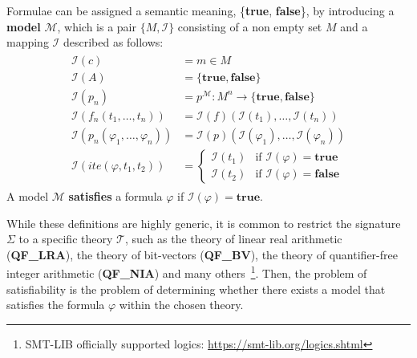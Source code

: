 \documentclass[runningheads]{llncs}
\begin{document}
Formulae can be assigned a semantic meaning, \{\textbf{true}, \textbf{false}\}, by introducing a \textbf{model} $\mathcal{M}$, which is a pair $\{M, \mathcal{I}\}$ consisting of a non empty set $M$ and a mapping $\mathcal{I}$ described as follows:
\begin{gather*}
    \begin{array}{ll}
        \mathcal{I}(c)                                & = m \in M                                                               \\
        \mathcal{I}(A)                                & = \{\textbf{true}, \textbf{false}\}                                     \\
        \mathcal{I}(p_n)                              & = p^{\mathcal{M}} : M^n \rightarrow \{\textbf{true}, \textbf{false}\}   \\
        \mathcal{I}(f_n(t_1, \dots, t_n))             & = \mathcal{I}(f)(\mathcal{I}(t_1), \dots, \mathcal{I}(t_n))             \\
        \mathcal{I}(p_n(\varphi_1, \dots, \varphi_n)) & = \mathcal{I}(p)(\mathcal{I}(\varphi_1), \dots, \mathcal{I}(\varphi_n)) \\
        \mathcal{I}(ite(\varphi, t_1, t_2))           & = \begin{cases}
                                                              \mathcal{I}(t_1) & \text{if } \mathcal{I}(\varphi) = \textbf{true}  \\
                                                              \mathcal{I}(t_2) & \text{if } \mathcal{I}(\varphi) = \textbf{false}
                                                          \end{cases}
    \end{array}
\end{gather*}
A model $\mathcal{M}$ \textbf{satisfies} a formula $\varphi$ if $\mathcal{I}(\varphi) = \textbf{true}$.

While these definitions are highly generic, it is common to restrict the signature $\Sigma$ to a specific theory $\mathcal{T}$, such as the theory of linear real arithmetic (\textbf{QF\_LRA}), the theory of bit-vectors (\textbf{QF\_BV}), the theory of quantifier-free integer arithmetic (\textbf{QF\_NIA}) and many others~\footnote{SMT-LIB officially supported logics: \url{https://smt-lib.org/logics.shtml}}.
Then, the problem of satisfiability is the problem of determining whether there exists a model that satisfies the formula $\varphi$ within the chosen theory.
\end{document}
